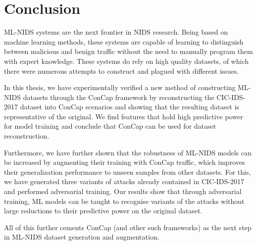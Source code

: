 \section{Conclusion}\label{conclusion}

ML-NIDS systems are the next frontier in NIDS research. Being based on machine learning methods, these systems are capable of learning to distinguish between malicious and benign traffic without the need to manually program them with expert knowledge. These systems do rely on high quality datasets, of which there were numerous attempts to construct and plagued with different issues. 

In this thesis, we have experimentally verified a new method of constructing ML-NIDS datasets through the ConCap framework by reconstructing the CIC-IDS-2017 dataset into ConCap scenarios and showing that the resulting dataset is representative of the original. We find features that hold high predictive power for model training and conclude that ConCap can be used for dataset reconstruction. 

Furthermore, we have further shown that the robustness of ML-NIDS models can be increased by augmenting their training with ConCap traffic, which improves their generalization performance to unseen samples from other datasets. For this, we have generated three variants of attacks already contained in CIC-IDS-2017 and performed adversarial training. Our results show that through adversarial training, ML models can be taught to recognise variants of the attacks without large reductions to their predictive power on the original dataset. 

All of this further cements ConCap (and other such frameworks) as the next step in ML-NIDS dataset generation and augmentation. 